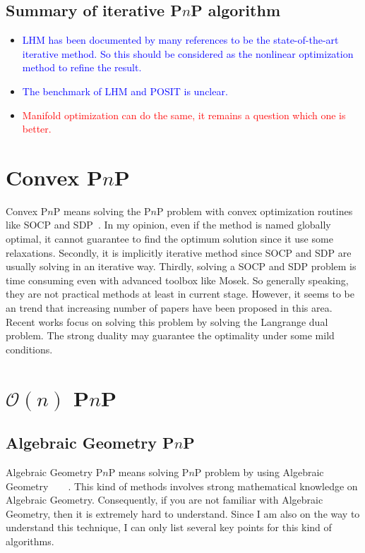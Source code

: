 \documentclass[a4paper]{report}
\begin{document}
\subsection{Summary of iterative P$n$P algorithm}
\begin{itemize}
\item \textcolor{blue}{LHM has been documented by many references to be the state-of-the-art iterative method. So this should be considered as the nonlinear optimization method to refine the result.}
\item \textcolor{blue}{The benchmark of LHM and POSIT is unclear.}
\item \textcolor{red}{Manifold optimization can do the same, it remains a question which one is better.}
\end{itemize}

\section{Convex P$n$P}
Convex P$n$P means solving the P$n$P problem with convex optimization routines like SOCP and SDP~\cite{schweighofer2008globally}. In my opinion, even if the method is named globally optimal, it cannot guarantee to find the optimum solution since it use some relaxations. Secondly, it is implicitly iterative method since SOCP and SDP are usually solving in an iterative way. Thirdly, solving a SOCP and SDP problem is time consuming even with advanced toolbox like Mosek. So generally speaking, they are not practical methods at least in current stage. However, it seems to be an trend that increasing number of papers have been proposed in this area. Recent works focus on solving this problem by solving the Langrange dual problem. The strong duality may guarantee the optimality under some mild conditions.

\section{$\mathcal{O}(n)$ P$n$P}
\subsection{Algebraic Geometry P$n$P}
Algebraic Geometry P$n$P means solving P$n$P problem by using Algebraic Geometry~\cite{zheng2013revisiting}~\cite{hesch2011direct}~\cite{kneip2014upnp}~\cite{zheng2013aspnp}\cite{triggs1999camera}. This kind of methods involves strong mathematical knowledge on Algebraic Geometry. Consequently, if you are not familiar with Algebraic Geometry, then it is extremely hard to understand. Since I am also on the way to understand this technique, I can only list several key points for this kind of algorithms.
\end{document}
